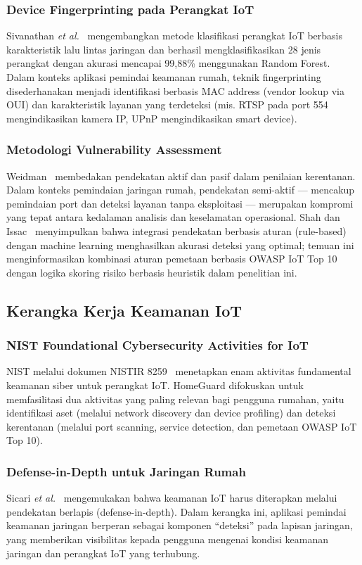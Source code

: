 \subsubsection{Device Fingerprinting pada Perangkat IoT}
Sivanathan \textit{et al.}~\cite{b14} mengembangkan metode klasifikasi
perangkat IoT berbasis karakteristik lalu lintas jaringan dan berhasil
mengklasifikasikan 28 jenis perangkat dengan akurasi mencapai 99,88\%
menggunakan Random Forest. Dalam konteks aplikasi pemindai keamanan rumah,
teknik fingerprinting disederhanakan menjadi identifikasi berbasis MAC address
(vendor lookup via OUI) dan karakteristik layanan yang terdeteksi (mis. RTSP
pada port 554 mengindikasikan kamera IP, UPnP mengindikasikan smart device).

\subsubsection{Metodologi Vulnerability Assessment}
Weidman~\cite{b15} membedakan pendekatan aktif dan pasif dalam penilaian
kerentanan. Dalam konteks pemindaian jaringan rumah, pendekatan semi-aktif ---
mencakup pemindaian port dan deteksi layanan tanpa eksploitasi --- merupakan
kompromi yang tepat antara kedalaman analisis dan keselamatan operasional.
Shah dan Issac~\cite{b16} menyimpulkan bahwa integrasi pendekatan berbasis
aturan (rule-based) dengan machine learning menghasilkan akurasi deteksi yang
optimal; temuan ini menginformasikan kombinasi aturan pemetaan berbasis OWASP
IoT Top 10 dengan logika skoring risiko berbasis heuristik dalam penelitian
ini.

\subsection{Kerangka Kerja Keamanan IoT}

\subsubsection{NIST Foundational Cybersecurity Activities for IoT}
NIST melalui dokumen NISTIR 8259~\cite{b17} menetapkan enam aktivitas
fundamental keamanan siber untuk perangkat IoT. HomeGuard difokuskan untuk
memfasilitasi dua aktivitas yang paling relevan bagi pengguna rumahan, yaitu
identifikasi aset (melalui network discovery dan device profiling) dan deteksi
kerentanan (melalui port scanning, service detection, dan pemetaan OWASP IoT
Top 10).

\subsubsection{Defense-in-Depth untuk Jaringan Rumah}
Sicari \textit{et al.}~\cite{b18} mengemukakan bahwa keamanan IoT harus
diterapkan melalui pendekatan berlapis (defense-in-depth). Dalam kerangka ini,
aplikasi pemindai keamanan jaringan berperan sebagai komponen ``deteksi'' pada
lapisan jaringan, yang memberikan visibilitas kepada pengguna mengenai kondisi
keamanan jaringan dan perangkat IoT yang terhubung.

